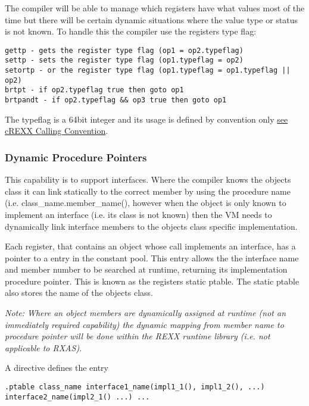 The compiler will be able to manage which registers have what values most of the time but there will be certain dynamic situations where the value type or status is not known. To handle this the compiler use the registers type flag:

\begin{verbatim}
gettp - gets the register type flag (op1 = op2.typeflag)
settp - sets the register type flag (op1.typeflag = op2)
setortp - or the register type flag (op1.typeflag = op1.typeflag || op2)
brtpt - if op2.typeflag true then goto op1
brtpandt - if op2.typeflag && op3 true then goto op1
\end{verbatim}

The typeflag is a 64bit integer and its usage is defined by convention only \protect\hyperlink{crexx-calling-convention}{see cREXX Calling Convention}.

\subsubsection{Dynamic Procedure Pointers}

This capability is to support interfaces. Where the compiler knows the object\textquotesingle{}s class it can link statically to the correct member by using the procedure name (i.e. class\_name.member\_name(), however when the object is only known to implement an interface (i.e. its class is not known) then the VM needs to dynamically link interface members to the object\textquotesingle{}s class specific implementation.

Each register, that contains an object whose call implements an interface, has a pointer to a entry in the constant pool. This entry allows the the interface name and member number to be searched at runtime, returning its implementation procedure pointer. This is known as the register\textquotesingle{}s static ptable. The static ptable also stores the name of the objects class.

\emph{Note: Where an object members are dynamically assigned at runtime (not an immediately required capability) the dynamic mapping from member name to procedure pointer will be done within the REXX runtime library (i.e. not applicable to RXAS).}

A directive defines the entry

\begin{verbatim}
.ptable class_name interface1_name(impl1_1(), impl1_2(), ...) interface2_name(impl2_1() ...) ...
\end{verbatim}

